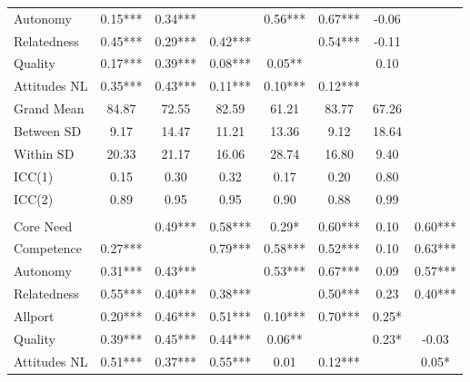 \begin{table}
\begin{minipage}[t][\textheight][t]{\textwidth}
{\begin{tabular}[t]{lccccccc}
\hspace{1em}Autonomy & 0.15*** & 0.34*** &  & 0.56*** & 0.67*** & -0.06 & \\
\hspace{1em}Relatedness & 0.45*** & 0.29*** & 0.42*** &  & 0.54*** & -0.11 & \\
\hspace{1em}Quality & 0.17*** & 0.39*** & 0.08*** & 0.05** &  & 0.10 & \\
\hspace{1em}Attitudes NL & 0.35*** & 0.43*** & 0.11*** & 0.10*** & 0.12*** &  & \\
\addlinespace
\hspace{1em}Grand Mean & 84.87 & 72.55 & 82.59 & 61.21 & 83.77 & 67.26 & \\
\hspace{1em}Between SD & 9.17 & 14.47 & 11.21 & 13.36 & 9.12 & 18.64 & \\
\hspace{1em}Within SD & 20.33 & 21.17 & 16.06 & 28.74 & 16.80 & 9.40 & \\
\hspace{1em}ICC(1) & 0.15 & 0.30 & 0.32 & 0.17 & 0.20 & 0.80 & \\
\hspace{1em}ICC(2) & 0.89 & 0.95 & 0.95 & 0.90 & 0.88 & 0.99 & \\
\addlinespace[0.3em]
\multicolumn{8}{l}{\textbf{Study 3}}\\
\hspace{1em}Core Need &  & 0.49*** & 0.58*** & 0.29* & 0.60*** & 0.10 & 0.60***\\
\hspace{1em}Competence & 0.27*** &  & 0.79*** & 0.58*** & 0.52*** & 0.10 & 0.63***\\
\hspace{1em}Autonomy & 0.31*** & 0.43*** &  & 0.53*** & 0.67*** & 0.09 & 0.57***\\
\hspace{1em}Relatedness & 0.55*** & 0.40*** & 0.38*** &  & 0.50*** & 0.23 & 0.40***\\
\hspace{1em}Allport & 0.20*** & 0.46*** & 0.51*** & 0.10*** & 0.70*** & 0.25* & \\
\hspace{1em}Quality & 0.39*** & 0.45*** & 0.44*** & 0.06** &  & 0.23* & -0.03\\
\hspace{1em}Attitudes NL & 0.51*** & 0.37*** & 0.55*** & 0.01 & 0.12*** &  & 0.05*\\

\end{tabular}}
\end{minipage}
\end{table}
